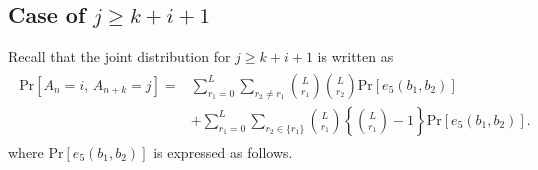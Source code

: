 \subsection{Case of $j \geq k+i+1$}
Recall that the joint distribution for $j \geq k+i+1$ is written as
\begin{align}\begin{split}
  \mathrm{Pr}[A_n=i,\, A_{n+k}=j] 
  =& \sum_{r_1=0}^{L} \sum_{r_2 \neq r_1} \binom{L}{r_1}\binom{L}{r_2}\mathrm{Pr}[e_5(b_1,b_2)] \\
  &+ \sum_{r_1=0}^{L} \sum_{r_2 \in \{r_1\}} \binom{L}{r_1}\left\{\binom{L}{r_1}-1\right\}\mathrm{Pr}[e_5(b_1,b_2)].
\end{split}\end{align}
where $\mathrm{Pr}[e_5(b_1,b_2)]$ is expressed as follows.
